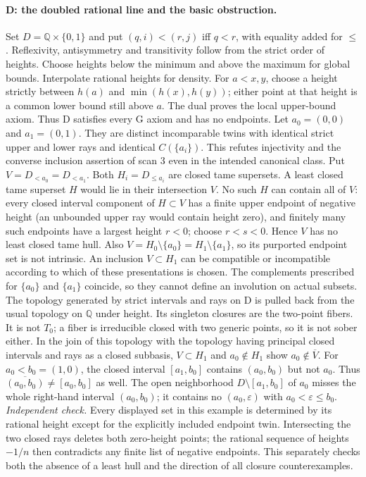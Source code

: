 \paragraph{D: the doubled rational line and the basic obstruction.}\label{lem:double}
Set $D=\mathbb Q\times\{0,1\}$ and put $(q,i)<(r,j)$ iff $q<r$, with equality added for $\leq$. Reflexivity, antisymmetry and transitivity follow from the strict order of heights. Choose heights below the minimum and above the maximum for global bounds. Interpolate rational heights for density. For $a<x,y$, choose a height strictly between $h(a)$ and $\min(h(x),h(y))$; either point at that height is a common lower bound still above $a$. The dual proves the local upper-bound axiom. Thus D satisfies every G axiom and has no endpoints.
Let $a_0=(0,0)$ and $a_1=(0,1)$. They are distinct incomparable twins with identical strict upper and lower rays and identical $C(\{a_i\})$. This refutes injectivity and the converse inclusion assertion of scan 3 even in the intended canonical class.
Put $V=D_{<a_0}=D_{<a_1}$. Both $H_i=D_{\leq a_i}$ are closed tame supersets. A least closed tame superset $H$ would lie in their intersection $V$. No such $H$ can contain all of $V$: every closed interval component of $H\subset V$ has a finite upper endpoint of negative height (an unbounded upper ray would contain height zero), and finitely many such endpoints have a largest height $r<0$; choose $r<s<0$. Hence $V$ has no least closed tame hull. Also $V=H_0\setminus\{a_0\}=H_1\setminus\{a_1\}$, so its purported endpoint set is not intrinsic. An inclusion $V\subset H_1$ can be compatible or incompatible according to which of these presentations is chosen. The complements prescribed for $\{a_0\}$ and $\{a_1\}$ coincide, so they cannot define an involution on actual subsets.
The topology generated by strict intervals and rays on D is pulled back from the usual topology on $\mathbb Q$ under height. Its singleton closures are the two-point fibers. It is not $T_0$; a fiber is irreducible closed with two generic points, so it is not sober either.
In the join of this topology with the topology having principal closed intervals and rays as a closed subbasis, $V\subset H_1$ and $a_0\notin H_1$ show $a_0\notin\overline V$. For $a_0<b_0=(1,0)$, the closed interval $[a_1,b_0]$ contains $(a_0,b_0)$ but not $a_0$. Thus $\overline{(a_0,b_0)}\ne[a_0,b_0]$ as well. The open neighborhood $D\setminus[a_1,b_0]$ of $a_0$ misses the whole right-hand interval $(a_0,b_0)$; it contains no $(a_0,\varepsilon)$ with $a_0<\varepsilon\leq b_0$.
\emph{Independent check.} Every displayed set in this example is determined by its rational height except for the explicitly included endpoint twin. Intersecting the two closed rays deletes both zero-height points; the rational sequence of heights $-1/n$ then contradicts any finite list of negative endpoints. This separately checks both the absence of a least hull and the direction of all closure counterexamples.

